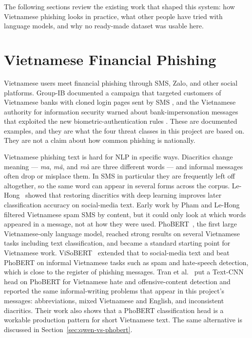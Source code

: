 The following sections review the existing work that shaped this system: how Vietnamese phishing looks in practice, what other people have tried with language models, and why no ready-made dataset was usable here.

\section{Vietnamese Financial Phishing}

Vietnamese users meet financial phishing through SMS, Zalo, and other social platforms. Group-IB documented a campaign that targeted customers of Vietnamese banks with cloned login pages sent by SMS \cite{groupib2022laser}, and the Vietnamese authority for information security warned about bank-impersonation messages that exploited the new biometric-authentication rules \cite{ais2024biometricwarning}. These are documented examples, and they are what the four threat classes in this project are based on. They are not a claim about how common phishing is nationally.

Vietnamese phishing text is hard for NLP in specific ways. Diacritics change meaning --- \textit{ma}, \textit{m\~a}, and \textit{m\`a} are three different words --- and informal messages often drop or misplace them. In SMS in particular they are frequently left off altogether, so the same word can appear in several forms across the corpus. Le-Hong~\cite{lehong2021diacritics} showed that restoring diacritics with deep learning improves later classification accuracy on social-media text. Early work by Pham and Le-Hong~\cite{pham2016vietnamese} filtered Vietnamese spam SMS by content, but it could only look at which words appeared in a message, not at how they were used. PhoBERT~\cite{nguyen2020phobert}, the first large Vietnamese-only language model, reached strong results on several Vietnamese tasks including text classification, and became a standard starting point for Vietnamese work. ViSoBERT~\cite{nguyen2023visobert} extended that to social-media text and beat PhoBERT on informal Vietnamese tasks such as spam and hate-speech detection, which is close to the register of phishing messages. Tran et al.~\cite{tran2022phobertcnn} put a Text-CNN head on PhoBERT for Vietnamese hate and offensive-content detection and reported the same informal-writing problems that appear in this project's messages: abbreviations, mixed Vietnamese and English, and inconsistent diacritics. Their work also shows that a PhoBERT classification head is a workable production pattern for short Vietnamese text. The same alternative is discussed in Section~\ref{sec:qwen-vs-phobert}.

